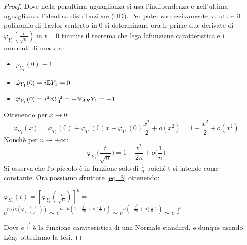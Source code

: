 \begin{theorem}
\begin{proof}
Dove nella penultima uguaglianza si usa l'indipendenza e nell'ultima uguaglianza l'identica distribuzione (IID).
\newline
Per poter successivamente valutare il polinomio di Taylor centrato in $0$ si determinano ora le prime due derivate di $\varphi_{Y_1}(\frac{t}{\sqrt{n}})$ in $t=0$ tramite il teorema che lega lafunzione caratteristica e i momenti di una v.a:
\begin{itemize}
    \item $\varphi_{Y_1}(0) = 1$
    \item $\dot{\varphi}_{Y_1}(0) = i\mathbb{E} Y_1 = 0$
    \item $\ddot{\varphi}_{Y_1}(0) = i^2\mathbb{E} Y_1^2 = -\mathbb{V}_{AR} Y_1 = -1$
\end{itemize}
Ottenendo per $x\rightarrow 0$:
\[\varphi_{Y_1}(x) = \varphi_{Y_1}(0) + \dot{\varphi}_{Y_1}(0)x + \ddot{\varphi}_{Y_1}(0)\frac{x^2}{2} + o(x^2) = 1 - \frac{x^2}{2} + o(x^2)\]
Nonchè per $n\rightarrow +\infty $:
\[\varphi_{Y_1}\bigg(\frac{t}{\sqrt{n}}\bigg) = 1 - \frac{t^2}{2n} + o\bigg(\frac{1}{n}\bigg) \]
Si osserva che l'o-piccolo è in funzione solo di $\frac{1}{n}$ poichè t si intende come constante.
\newline
Ora possiamo sfruttare \ref{eq_3} ottenendo:
\begin{center}
    $\varphi_{S_n}(t)=[\varphi_{Y_1}(\frac{t}{\sqrt{n}})]^n=${\large$e^{n\cdot ln(\varphi_{Y_1}(\frac{t}{\sqrt{n}}))}\sim e^{n\cdot ln(1 - \frac{t^2}{2n} + o(\frac{1}{n}))}\sim e^{n(-\frac{t^2}{2n}+o(\frac{1}{n}))}\sim e^{\frac{-t^2}{2}}$}
\end{center}
Dove $e^{\frac{-t^2}{2}}$ è la funzione caratteristica di una Normale standard, e dunque usando Lèny otteniamo la tesi.
\end{proof}
\end{theorem}